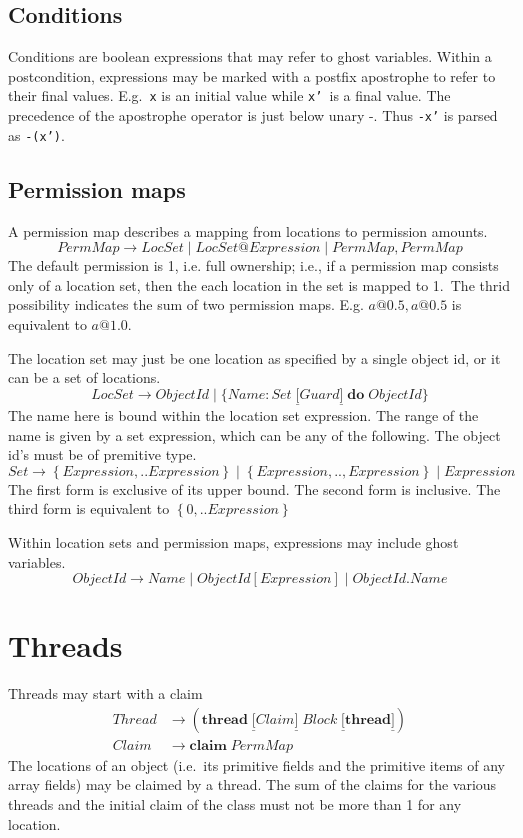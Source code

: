 \documentclass{article}%
\begin{document}
\subsection{Conditions}

Conditions are boolean expressions that may refer to ghost variables. Within a
postcondition, expressions may be marked with a postfix apostrophe to refer to their
final values. E.g.\ \texttt{x} is an initial value while \texttt{x' }is a
final value.
 The precedence of the apostrophe operator is just below unary -. Thus \texttt{-x'} is parsed as \texttt{-(x')}.
\subsection{Permission maps}

A permission map describes a mapping from locations to permission amounts.
\[
PermMap\rightarrow LocSet\mid LocSet@Expression\mid PermMap,PermMap
\]
The default permission is 1, i.e. full ownership; i.e., if a permission map
consists only of a location set, then the each location in the set is mapped
to 1.\ The thrid possibility indicates the sum of two permission maps. E.g.
$a@0.5,a@0.5$ is equivalent to $a@1.0$.

The location set may just be one location as specified by a single object id,
or it can be a set of locations.%
\[
LocSet\rightarrow ObjectId\mid\{Name:Set\;\underline{[}Guard\underline{]}%
\;\mathbf{do}\;ObjectId\}
\]
The name here is bound within the location set expression. The range of the
name is given by a set expression, which can be any of the following. The
object id's must be of premitive type.%
\[
Set\rightarrow\left\{  Expression,..Expression\right\}  \mid\left\{
Expression,..,Expression\right\}  \mid Expression
\]
The first form is exclusive of its upper bound. The second form is inclusive.
The third form is equivalent to $\left\{  0,..Expression\right\}  $

Within location sets and permission maps, expressions may include ghost
variables.%
\[
ObjectId\rightarrow Name\mid ObjectId[Expression]\mid ObjectId.Name
\]


\section{Threads}

Threads may start with a claim
\begin{align*}
Thread &  \rightarrow(\mathbf{thread}\;\underline{[}Claim\underline{]}%
\;Block\;\underline{[}\mathbf{thread}\underline{]})\\
Claim &  \rightarrow\mathbf{claim}\;PermMap
\end{align*}
The locations of an object (i.e.\ its primitive fields and the primitive items
of any array fields) may be claimed by a thread. The sum of the claims for the
various threads and the initial claim of the class must not be more than 1 for
any location.
\end{document}
